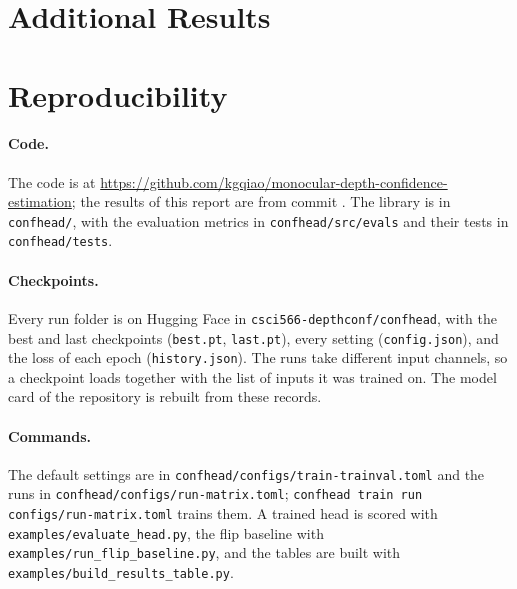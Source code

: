 \section{Additional Results}
\label{app:more}


\section{Reproducibility}
\label{app:repro}

\paragraph{Code.} The code is at \url{https://github.com/kgqiao/monocular-depth-confidence-estimation}; the results of this report are from commit . The library is in \texttt{confhead/}, with the evaluation metrics in \texttt{confhead/src/evals} and their tests in \texttt{confhead/tests}.

\paragraph{Checkpoints.} Every run folder is on Hugging Face in \texttt{csci566-depthconf/confhead}, with the best and last checkpoints (\texttt{best.pt}, \texttt{last.pt}), every setting (\texttt{config.json}), and the loss of each epoch (\texttt{history.json}). The runs take different input channels, so a checkpoint loads together with the list of inputs it was trained on. The model card of the repository is rebuilt from these records. 

\paragraph{Commands.} The default settings are in \texttt{confhead/configs/train-trainval.toml} and the runs in \texttt{confhead/configs/run-matrix.toml}; \texttt{confhead train run configs/run-matrix.toml} trains them. A trained head is scored with \texttt{examples/evaluate\_head.py}, the flip baseline with \texttt{examples/run\_flip\_baseline.py}, and the tables are built with \texttt{examples/build\_results\_table.py}. 
